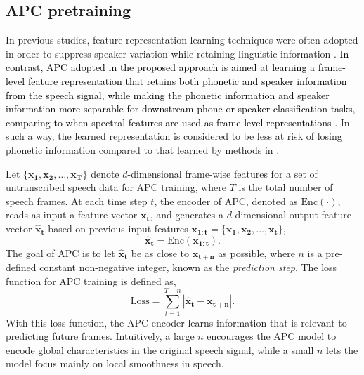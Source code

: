 \documentclass[transmag]{IEEEtran}
\begin{document}
\subsection{APC pretraining}
\label{subsec:approach_apc}
In previous studies, feature representation learning techniques were often adopted in order to suppress speaker variation while retaining linguistic information \cite{heck2017feature,feng2018exploiting,feng2019_TASLP}. 
\textcolor{black}{In contrast, APC adopted in the proposed approach is aimed at learning a frame-level feature representation that retains both phonetic and speaker information from the speech signal, while making the phonetic information and  speaker information more separable for downstream  phone or speaker classification tasks, comparing to when spectral features are used as frame-level representations \cite{Chung2019}.}
In such a way, the learned representation is considered to be less at risk of losing phonetic information compared to that learned by methods in \cite{heck2017feature,feng2018exploiting,feng2019_TASLP}.

Let $\{\bm{x_1},\bm{x_2}, \ldots, \bm{x_T} \}$ denote $d$-dimensional frame-wise features for a set of untranscribed speech data for APC training, where $T$ is the total number of speech frames. 
At each time step $t$, the encoder of APC, denoted as $\mathrm{Enc} (\cdot)$, reads as input a feature vector $\bm{x_t}$, and generates a $d$-dimensional output feature vector $\bm{\hat{x}_t}$ based on 
previous input features $\bm{x_{1:t}} = \{\bm{x_1}, \bm{x_2}, \ldots, \bm{x_t}\}$, 
\begin{equation}
    \bm{\hat{x}_t} = \mathrm{Enc} (\bm{x_{1:t}}).\label{eqt:enc}
\end{equation}
The goal of APC is to let $\bm{\hat{x}_t}$ be as close to $\bm{x_{t+n}}$ as possible, where $n$ is a pre-defined constant non-negative integer, known as the \textit{prediction step}. The loss function for APC training is defined as,
\begin{equation}
    \mathrm{Loss} = \sum_{t=1}^{T-n} \left| \bm{\hat{x}_t}  - \bm{x_{t+n}}\right|.
\end{equation}
With this loss function, the APC encoder learns information that is relevant to predicting future frames. 
Intuitively, a large $n$ encourages the APC model to encode  global characteristics in the original speech signal, while a small $n$ lets the model   focus mainly on local smoothness in speech. 
\end{document}
